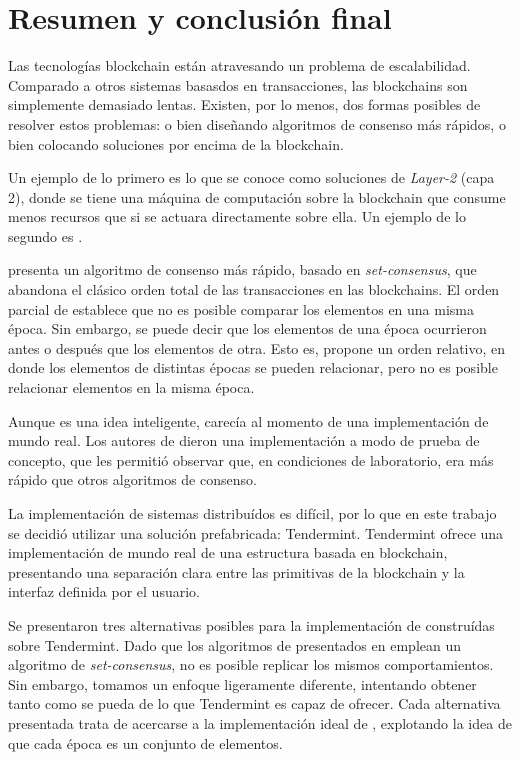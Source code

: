 \section{Resumen y conclusión final}\label{sec:conclusion}
%
Las tecnologías blockchain están atravesando un problema de escalabilidad.
%
Comparado a otros sistemas basasdos en transacciones, las blockchains son simplemente
demasiado lentas.
%
Existen, por lo menos, dos formas posibles de resolver estos problemas: o bien
diseñando algoritmos de consenso más rápidos, o bien colocando soluciones por
encima de la blockchain.

%
Un ejemplo de lo primero es lo que se conoce como soluciones de \emph{Layer-2}
(capa 2),
donde se tiene una máquina de computación sobre la blockchain que consume menos
recursos que si se actuara directamente sobre ella.
%
Un ejemplo de lo segundo es \setchain.

\setchain presenta un algoritmo de consenso más rápido, basado en
\textit{set-consensus},
que abandona el clásico orden total de las transacciones en las blockchains.
%
El orden parcial de \setchain establece que no es posible comparar los elementos
en una misma época.
%
Sin embargo, se puede decir que los elementos de una época ocurrieron antes o después
que los elementos de otra.
%
Esto es, \setchain propone un orden relativo, en donde los elementos
de distintas épocas se pueden relacionar, pero no es posible relacionar elementos
en la misma época.

Aunque \setchain es una idea inteligente, carecía al momento de una implementación
de mundo real.
%
Los autores de \setchain dieron una implementación a modo de prueba de concepto,
que les permitió observar que, en condiciones de laboratorio,
era más rápido que otros algoritmos de consenso.
%

La implementación de sistemas distribuídos es difícil, por lo que en este trabajo
se decidió utilizar una solución prefabricada: Tendermint.
Tendermint ofrece una implementación
de mundo real de una estructura basada en blockchain, presentando una separación clara
entre las primitivas de la blockchain y la interfaz definida por el usuario.


Se presentaron tres alternativas posibles para la implementación
de \setchain construídas sobre Tendermint. Dado que los algoritmos de \setchain
presentados en \cite{Capretto.2022.Setchain} emplean un algoritmo de
\textit{set-consensus}\cite{redbelly}, 
no es posible replicar los mismos comportamientos.
Sin embargo, tomamos un enfoque ligeramente diferente,
intentando obtener tanto como se pueda de lo que Tendermint es capaz de ofrecer.
Cada alternativa presentada trata de acercarse a la implementación ideal de \setchain,
explotando la idea de que cada época es un conjunto de elementos.

